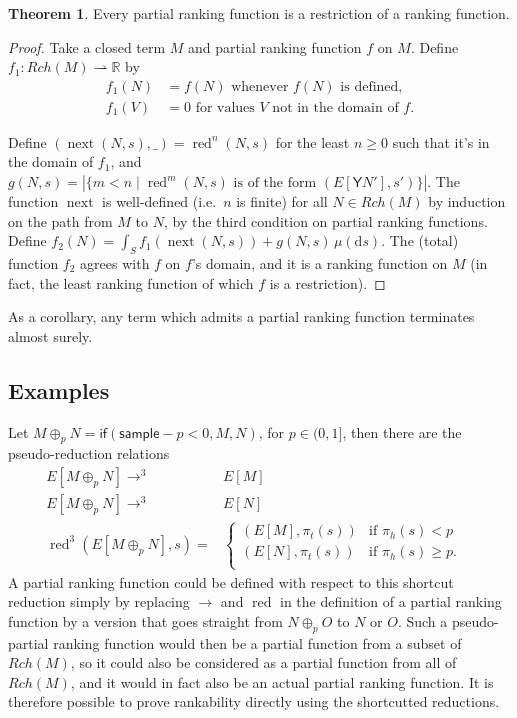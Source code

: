 \documentclass{article}
\newcommand{\tY}{\mathsf{Y}}
\newcommand{\tif}[3]{\mathsf{if}(#1, #2, #3)} %
\newcommand{\tsample}{\mathsf{sample}}
\DeclareMathOperator{\red}{red}
\DeclareMathOperator{\nnext}{next}
\theoremstyle{definition}
\theoremstyle{lemma}
\newtheorem{theorem}{Theorem}
\theoremstyle{remark}
\begin{document}
\begin{theorem} \label{partial implies rankable}
Every partial ranking function is a restriction of a ranking function.
\end{theorem}
\begin{proof}
Take a closed term $M$ and partial ranking function $f$ on $M$. Define $f_1 : Rch(M) \rightharpoonup \mathbb R$ by
\begin{align*}
    f_1(N) & = f(N) \text{ whenever $f(N)$ is defined,} \\
    f_1(V) & = 0 \text{ for values $V$ not in the domain of $f$.}
\end{align*}

Define $(\nnext(N,s),\_) = \red^n(N,s)$ for the least $n \geq 0$ such that it's in the domain of $f_1$, and $g(N,s) = \left | \{m < n \mid \red^m(N,s) \text{ is of the form } (E[\tY N'],s') \} \right |$. 
The function $\nnext$ is well-defined (i.e.~$n$ is finite) for all $N \in Rch(M)$ by induction on the path from $M$ to $N$, by the third condition on partial ranking functions. Define $f_2(N) = \int_S f_1(\nnext(N,s)) + g(N,s) \, \mu(\mathrm d s)$. The (total) function $f_2$ agrees with $f$ on $f$'s domain, and it is a ranking function on $M$ (in fact, the least ranking function of which $f$ is a restriction).
\end{proof}


As a corollary, any term which admits a partial ranking function terminates almost surely.

\subsection{Examples}
Let $M \oplus_p N = \tif{\tsample - p < 0} M N$, for $p \in (0,1]$, then there are the pseudo-reduction relations
\begin{align*}
E[M \oplus_p N] \to^3 & E[M] & \\
E[M \oplus_p N] \to^3 & E[N] & \\
\red^3(E[M \oplus_p N], s) = & \left\{
    \begin{array}{ll}
        (E[M],\pi_t(s)) & \text{if } \pi_h(s) < p \\
        (E[N],\pi_t(s)) & \text{if } \pi_h(s) \geq p. \\
    \end{array} \right .
\end{align*}
A partial ranking function could be defined with respect to this shortcut reduction simply by replacing $\to$ and $\red$ in the definition of a partial ranking function by a version that goes straight from $N \oplus_p O$ to $N$ or $O$. Such a pseudo-partial ranking function would then be a partial function from a subset of $Rch(M)$, so it could also be considered as a partial function from all of $Rch(M)$, and it would in fact also be an actual partial ranking function. It is therefore possible to prove rankability directly using the shortcutted reductions.
\end{document}
